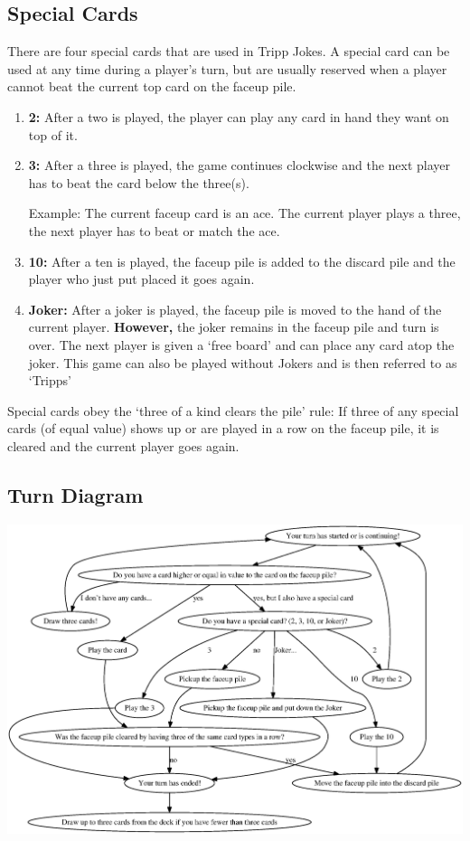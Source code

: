 \documentclass{article}
\begin{document}
\subsection*{Special Cards}
There are four special cards that are used in Tripp Jokes. A special card can be used at any time during a player's turn, but are usually reserved when a player cannot beat the current top card on the faceup pile.
\begin{enumerate}
	\item \textbf{2:} After a two is played, the player can play any card in hand they want on top of it.
	\item \textbf{3:} After a three is played, the game continues clockwise and the next player has to beat the card below the three(s).

	Example: The current faceup card is an ace. The current player plays a three, the next player has to beat or match the ace.
	\item \textbf{10:} After a ten is played, the faceup pile is added to the discard pile and the player who just put placed it goes again.
	\item \textbf{Joker:} After a joker is played, the faceup pile is moved to the hand of the current player. \textbf{However,} the joker remains in the faceup pile and turn is over. The next player is given a `free board' and can place any card atop the joker. This game can also be played without Jokers and is then referred to as `Tripps'
\end{enumerate}

Special cards obey the `three of a kind clears the pile' rule: If three of any special cards (of equal value) shows up or are played in a row on the faceup pile, it is cleared and the current player goes again.

\subsection*{Turn Diagram}
\includegraphics[width=6.5in]{Turns.eps}
\end{document}
